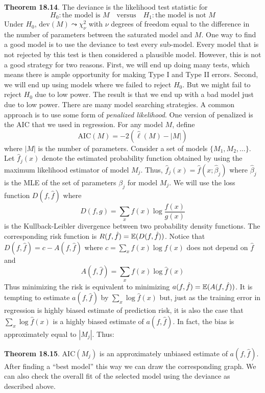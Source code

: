 \textbf{Theorem 18.14}. The deviance is the likelihood test statistic for
\[
H_{0} : \text{the model is } M
\quad \text{versus} \quad
H_{1} : \text{the model is not } M
\]
Under \(H_{0}\), \(\text{dev}(M) \leadsto \chi^{2}_\nu\) with \(\nu\) degrees of freedom equal to the difference in the number of parameters between the saturated model and \(M\).
One way to find a good model is to use the deviance to test every sub-model. Every model that is not rejected by this test is then considered a plausible model. However, this is not a good strategy for two reasons. First, we will end up doing many tests, which means there is ample opportunity for making Type I and Type II errors. Second, we will end up using models where we failed to reject \(H_{0}\). But we might fail to reject \(H_{0}\) due to low power. The result is that we end up with a bad model just due to low power.
There are many model searching strategies. A common approach is to use some form of \emph{penalized likelihood}. One version of penalized is the AIC that we used in regression. For any model \(M\), define
\[
\text{AIC}(M) = -2 \left( \hat{\ell}(M) - |M|\right) 
\]
where \(|M|\) is the number of parameters.
Consider a set of models \(\{ M_{1}, M_{2}, \dots \}\). Let \(\hat{f}_{j}(x)\) denote the estimated probability function obtained by using the maximum likelihood estimator of model \(M_{j}\). Thus, \(\hat{f}_{j}(x) = \hat{f}(x; \hat{\beta}_{j})\) where \(\hat{\beta}_{j}\) is the MLE of the set of parameters \(\beta_{j}\) for model \(M_{j}\). We will use the loss function \(D(f, \hat{f})\) where
\[
D(f, g) = \sum_x f(x) \log \frac{f(x)}{g(x)}
\]
is the Kullback-Leibler divergence between two probability density functions. The corresponding risk function is \(R(f, \hat{f}) = \operatorname{\mathbb{E}}(D(f, \hat{f}))\).
Notice that \(D(f, \hat{f}) = c - A(f, \hat{f})\) where \(c = \sum_x f(x) \log f(x)\) does not depend on \(\hat{f}\) and
\[
A(f, \hat{f}) = \sum_x f(x) \log \hat{f}(x)
\]
Thus minimizing the risk is equivalent to minimizing \(a(f, \hat{f}) = \operatorname{\mathbb{E}}(A(f, \hat{f}))\).
It is tempting to estimate \(a(f, \hat{f})\) by \(\sum_x \log \hat{f}(x)\) but, just as the training error in regression is highly biased estimate of prediction risk, it is also the case that \(\sum_x \log \hat{f}(x)\) is a highly biased estimate of \(a(f, \hat{f})\). In fact, the bias is approximately equal to \(|M_{j}|\). Thus:

\textbf{Theorem 18.15}. \(\text{AIC}(M_{j})\) is an approximately unbiased estimate of \(a(f, \hat{f})\).
After finding a ``best model'' this way we can draw the corresponding graph. We can also check the overall fit of the selected model using the deviance as described above.

